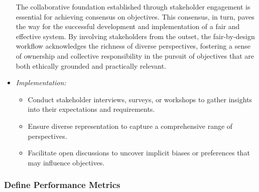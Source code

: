 \begin{itemize}
    The collaborative foundation established through stakeholder engagement is essential for achieving consensus on objectives. This consensus, in turn, paves the way for the successful development and implementation of a fair and effective system. By involving stakeholders from the outset, the fair-by-design workflow acknowledges the richness of diverse perspectives, fostering a sense of ownership and collective responsibility in the pursuit of objectives that are both ethically grounded and practically relevant.
    
    \item \emph{Implementation:}

        \begin{itemize}
            
            \item Conduct stakeholder interviews, surveys, or workshops to gather insights into their expectations and requirements.
            
            \item Ensure diverse representation to capture a comprehensive range of perspectives.
            
            \item Facilitate open discussions to uncover implicit biases or preferences that may influence objectives.
        
        \end{itemize}

\end{itemize}

\subsubsection{Define Performance Metrics}

